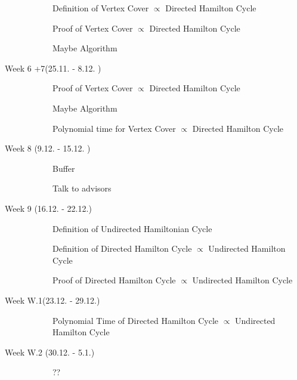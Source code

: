 \documentclass[11pt,a4paper]{scrartcl}
\begin{document}
\begin{description}
\begin{description}
			\item[\textcolor{Green}{\CheckedBox}] Definition of Vertex Cover $\varpropto$ Directed Hamilton Cycle
		\end{description} 
		\begin{description}
			\item[\textcolor{Red}{\XBox}] Proof of Vertex Cover $\varpropto$ Directed Hamilton Cycle
			\item[\textcolor{Red}{\XBox}] Maybe Algorithm
		\end{description}
		\item[Week 6 +7(25.11. - 8.12. )] \hfill		
		\begin{description}
			\item[\Square] Proof of Vertex Cover $\varpropto$ Directed Hamilton Cycle
			\item[\Square] Maybe Algorithm
		\end{description}
		\begin{description}
			\item[\Square] Polynomial time for Vertex Cover $\varpropto$ Directed Hamilton Cycle
		\end{description}
		\item[Week 8 (9.12. - 15.12. )] \hfill 
		\begin{description}
			\item[\Square] Buffer
			\item[\Square] Talk to advisors
		\end{description}
		\item[Week 9 (16.12. - 22.12.)]\hfill 
		\begin{description}
			\item[\Square] Definition of Undirected Hamiltonian Cycle
			\item[\Square] Definition of Directed Hamilton Cycle $\varpropto$ Undirected Hamilton Cycle
			\item[\Square] Proof of Directed Hamilton Cycle $\varpropto$ Undirected Hamilton Cycle
		\end{description}
		\item[Week W.1(23.12. - 29.12.)] \hfill
		\begin{description}
			\item[\Square] Polynomial Time of Directed Hamilton Cycle $\varpropto$ Undirected Hamilton Cycle
		\end{description}
		\item[Week W.2 (30.12. - 5.1.)] \hfill 
		\begin{description}
			\item[\Square] ??

\end{description}
\end{description}
\end{document}
